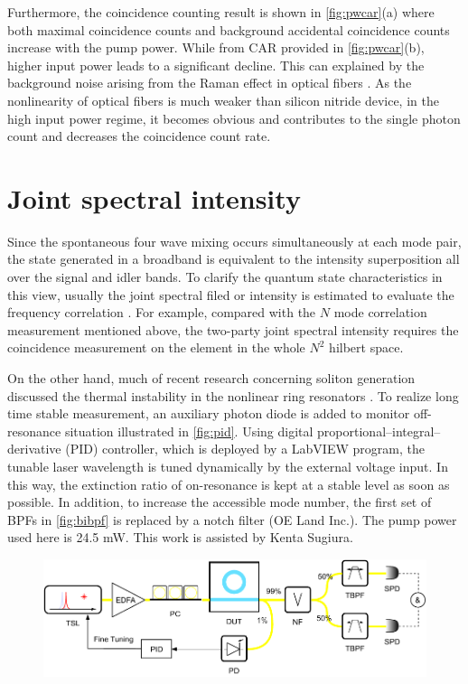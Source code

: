 Furthermore, the coincidence counting result is shown in \autoref{fig:pwcar}(a) where both maximal coincidence counts and background accidental coincidence counts increase with the pump power. While from CAR provided in \autoref{fig:pwcar}(b), higher input power leads to a significant decline. This can explained by the background noise arising from the Raman effect in optical fibers \cite{Engin2012, Sugiura2019}
. As the nonlinearity of optical fibers is much weaker than silicon nitride device, in the high input power regime, it becomes obvious and contributes to the single photon count and decreases the coincidence count rate.

\section{Joint spectral intensity}

Since the spontaneous four wave mixing occurs simultaneously at each mode pair, the state generated in a broadband is equivalent to the intensity superposition all over the signal and idler bands. To clarify the quantum state characteristics in this view, usually the joint spectral filed or intensity is estimated to evaluate the frequency correlation \cites{Helt2010,Vernon2015b}. For example, compared with the $ N $ mode correlation measurement mentioned above, the two-party joint spectral intensity requires the coincidence measurement on the element in the whole $ N^2 $ hilbert space.

On the other hand, much of recent research concerning soliton generation discussed the thermal instability in the nonlinear ring resonators \cites{Guo2017a,Herr2012}. 
To realize long time stable measurement, an auxiliary photon diode is added to monitor off-resonance situation illustrated in \autoref{fig:pid}. Using digital proportional–integral–derivative (PID) controller, which is deployed by a LabVIEW program, the tunable laser wavelength is tuned dynamically by the external voltage input. In this way, the extinction ratio of on-resonance is kept at a stable level as soon as possible. In addition, to increase the accessible mode number, the first set of BPFs in \autoref{fig:bibpf} is replaced by a notch filter (OE Land Inc.). The pump power used here is 24.5 mW. This work is assisted by Kenta Sugiura.

\begin{figure}
	\centering
	\includegraphics[width=1\linewidth]{imgs/pid.pdf}
	\label{fig:pid}
\end{figure}

